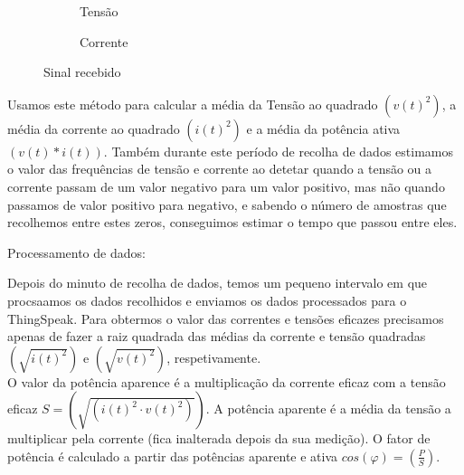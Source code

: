 \documentclass[12pt]{article}
\begin{document}
\begin{figure}[H]
  \begin{subfigure}[b]{0.5\textwidth}
      \centering
      \caption{Tensão}
      \label{fig:esp_tensao}
  \end{subfigure}%
  \begin{subfigure}[b]{0.5\textwidth}
      \centering
      \caption{Corrente}
      \label{fig:esp_corrente}
  \end{subfigure}%
  \caption{Sinal recebido}
\end{figure}

Usamos este método para calcular a média da Tensão ao quadrado
\((v(t)^2)\), a média da corrente ao quadrado \((i(t)^2)\) e a média da
potência ativa \((v(t) * i(t))\). 
Também durante este período de recolha
de dados estimamos o valor das frequências de tensão e corrente 
ao detetar quando a tensão ou a corrente passam de um valor 
negativo para um valor positivo, mas não quando passamos de
valor positivo para negativo, e sabendo o número de amostras que
recolhemos entre estes zeros, conseguimos estimar o tempo que
passou entre eles. 

\noindent Processamento de dados: \par
\noindent Depois do minuto de recolha de dados, temos um pequeno intervalo
em que procsaamos os dados recolhidos e enviamos os dados processados
para o ThingSpeak. 
Para obtermos o valor das correntes e tensões eficazes
precisamos apenas de fazer a raiz quadrada das médias da corrente e
tensão quadradas \((\sqrt{i(t)^2})\) e \((\sqrt{v(t)^2})\), respetivamente.\\
O valor da potência aparence é a multiplicação da corrente eficaz com
a tensão eficaz \(S = (\sqrt{(i(t)^2 \cdot v(t)^2)})\). A potência aparente
é a média da tensão a multiplicar pela corrente (fica inalterada depois
da sua medição). O fator de potência é calculado a partir das potências 
aparente e ativa \(cos(\varphi) = (\frac{P}{S})\).
\end{document}

